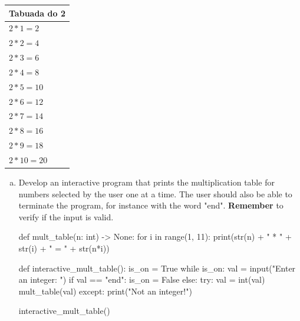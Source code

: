 \documentclass[12pt]{article}
\begin{document}
\begin{table}[!ht]
  \begin{center}
      \begin{tabular}{ | m{7em} | }
          \hline
          Tabuada do 2  \\
          \hline
          $2 * 1 = 2$   \\
          \hline
          $2 * 2 = 4$   \\
          \hline
          $2 * 3 = 6$   \\
          \hline
          $2 * 4 = 8$   \\
          \hline
          $2 * 5 = 10$  \\
          \hline
          $2 * 6 = 12$  \\
          \hline
          $2 * 7 = 14$  \\
          \hline
          $2 * 8 = 16$  \\
          \hline
          $2 * 9 = 18$  \\
          \hline
          $2 * 10 = 20$ \\
          \hline
      \end{tabular}
  \end{center}
\end{table}
\vspace{-7mm}
\begin{enumerate}[a)]
  \item Develop an interactive program that prints the multiplication table
    for numbers selected by the user one at a time. The user should also be
    able to terminate the program, for instance with the word "end". 
    \textbf{Remember} to verify if the input is valid.
\begin{pythonlst}
def mult_table(n: int) -> None:
  for i in range(1, 11):
    print(str(n) + " * " + str(i) + " = " + str(n*i))

def interactive_mult_table():
  is_on = True
  while is_on:
    val = input("Enter an integer: ")
    if val == "end":
      is_on = False
    else:
      try:
        val = int(val)
        mult_table(val)
      except:
        print("Not an integer!")

interactive_mult_table()
\end{pythonlst}
\end{enumerate}
\end{document}
